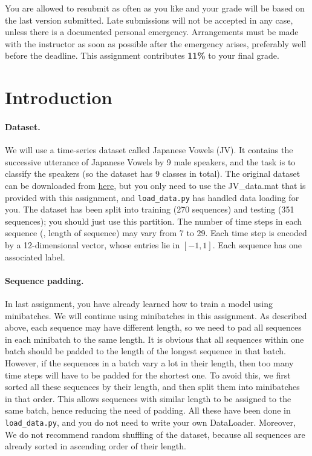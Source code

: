 \documentclass[11pt]{report}
\begin{document}
You are allowed to resubmit as often as you like and your grade will be based on the last version submitted.
Late submissions will not be accepted in any case, 
unless there is a documented personal emergency.  
Arrangements must be made with the instructor as soon as possible after the emergency arises,
preferably well before the deadline.
This assignment contributes {\bf 11\%} to your final grade.




\section{Introduction}
\label{sec:Introduction}

\paragraph{Dataset.}

We will use a time-series dataset called Japanese Vowels (JV).
It contains the successive utterance of Japanese Vowels by 9 male speakers, 
and the task is to classify the speakers 
(so the dataset has 9 classes in total). 
The original dataset can be downloaded from \href{https://archive.ics.uci.edu/ml/datasets/Japanese+Vowels}{here},
but you only need to use the JV\_data.mat that is provided with this assignment,
and \texttt{load\_data.py} has handled data loading for you.
The dataset has been split into training (270 sequences) and testing (351 sequences); you should just use this partition. 
The number of time steps in each sequence (\ie, length of sequence) may vary from 7 to 29. 
Each time step is encoded by a 12-dimensional vector, 
whose entries lie in $[-1,1]$. 
Each sequence has one associated label.




\paragraph{Sequence padding.}
\label{par:padding}
In last assignment, you have already learned how to train a model using minibatches. 
We will continue using minibatches in this assignment. 
As described above, each sequence may have different length, 
so we need to pad all sequences in each minibatch to the same length. It is obvious that all sequences within one batch should be padded to the length of the longest sequence in that batch. 
However, if the sequences in a batch vary a lot in their length,
then too many time steps will have to be padded for the shortest one. 
To avoid this, we first sorted all these sequences by their length, 
and then split them into minibatches in that order. 
This allows sequences with similar length to be assigned to the same batch, hence reducing the need of padding. 
All these have been done in \texttt{load\_data.py}, 
and you do not need to write your own DataLoader. 
Moreover, We do not recommend random shuffling of the dataset, 
because all sequences are already sorted in ascending order of their length.
\end{document}

